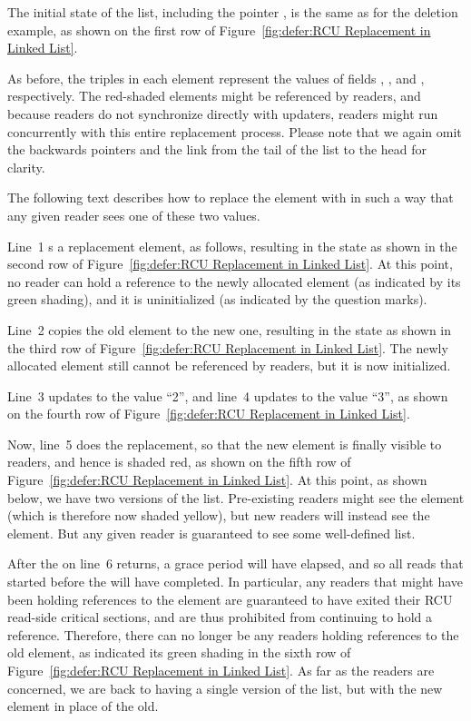 The initial state of the list, including the pointer ,
is the same as for the deletion example, as shown on the
first row of
Figure~\ref{fig:defer:RCU Replacement in Linked List}.

As before,
the triples in each element represent the values of fields ,
, and , respectively.
The red-shaded elements might be referenced by readers,
and because readers do not synchronize directly with updaters,
readers might run concurrently with this entire replacement process.
Please note that
we again omit the backwards pointers and the link from the tail
of the list to the head for clarity.

The following text describes how to replace the  element
with  in such a way that any given reader sees one of these
two values.

Line~1 s a replacement element, as follows,
resulting in the state as shown in the second row of
Figure~\ref{fig:defer:RCU Replacement in Linked List}.
At this point, no reader can hold a reference to the newly allocated
element (as indicated by its green shading), and it is uninitialized
(as indicated by the question marks).

Line~2 copies the old element to the new one, resulting in the
state as shown in the third row of
Figure~\ref{fig:defer:RCU Replacement in Linked List}.
The newly allocated element still cannot be referenced by readers, but
it is now initialized.

Line~3 updates  to the value ``2'', and
line~4 updates  to the value ``3'', as shown on the fourth row of
Figure~\ref{fig:defer:RCU Replacement in Linked List}.

Now, line~5 does the replacement, so that the new element is
finally visible to readers, and hence is shaded red, as shown on
the fifth row of
Figure~\ref{fig:defer:RCU Replacement in Linked List}.
At this point, as shown below, we have two versions of the list.
Pre-existing readers might see the  element (which is
therefore now shaded yellow), but
new readers will instead see the  element.
But any given reader is guaranteed to see some well-defined list.

After the  on line~6 returns,
a grace period will have elapsed, and so all reads that started before the
 will have completed.
In particular, any readers that might have been holding references
to the  element are guaranteed to have exited
their RCU read-side critical sections, and are thus prohibited from
continuing to hold a reference.
Therefore, there can no longer be any readers holding references
to the old element, as indicated its green shading in the sixth row of
Figure~\ref{fig:defer:RCU Replacement in Linked List}.
As far as the readers are concerned, we are back to having a single version
of the list, but with the new element in place of the old.

